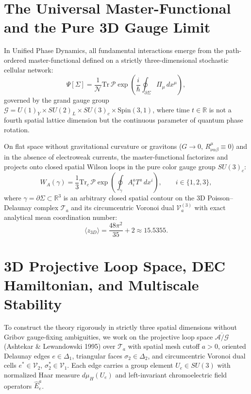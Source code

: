 \documentclass[11pt, a4paper]{article}
\theoremstyle{definition}
\theoremstyle{remark}
\begin{document}
\section{The Universal Master-Functional and the Pure 3D Gauge Limit}

In Unified Phase Dynamics, all fundamental interactions emerge from the path-ordered master-functional defined on a strictly three-dimensional stochastic cellular network:
\begin{equation}
  \Psi[\Sigma] = \frac{1}{\mathcal{N}} \mathrm{Tr}\,\mathcal{P}\exp\!\left(\frac{i}{\hbar}\oint_{\partial\Sigma} \Pi_{\mu}\,dx^{\mu}\right),
\end{equation}
governed by the grand gauge group $\mathcal{G} = U(1)_{Y} \times SU(2)_{L} \times SU(3)_{c} \times \mathrm{Spin}(3,1)$, where time $t \in \mathbb{R}$ is not a fourth spatial lattice dimension but the continuous parameter of quantum phase rotation.

On flat space without gravitational curvature or gravitons ($G \to 0$, $R^{\mu}_{\nu\alpha\beta} \equiv 0$) and in the absence of electroweak currents, the master-functional factorizes and projects onto closed spatial Wilson loops in the pure color gauge group $SU(3)_{c}$:
\begin{equation}
  W_{A}(\gamma) = \frac{1}{3}\mathrm{Tr}_{c}\,\mathcal{P}\exp\!\left(\oint_{\gamma} A_{i}^{a}T^{a}\,dx^{i}\right), \qquad i \in \{1, 2, 3\},
\end{equation}
where $\gamma = \partial\Sigma \subset \mathbb{R}^{3}$ is an arbitrary closed spatial contour on the 3D Poisson--Delaunay complex $\mathcal{T}_{a}$ and its circumcentric Voronoi dual $\mathcal{V}_{a}^{(3)}$ with exact analytical mean coordination number:
\begin{equation}
  \langle z_{3D} \rangle = \frac{48\pi^{2}}{35} + 2 \approx 15.5355.
\end{equation}

\section{3D Projective Loop Space, DEC Hamiltonian, and Multiscale Stability}

To construct the theory rigorously in strictly three spatial dimensions without Gribov gauge-fixing ambiguities, we work on the projective loop space $\overline{\mathcal{A}/\mathcal{G}}$ (Ashtekar \& Lewandowski 1995) over $\mathcal{T}_{a}$ with spatial mesh cutoff $a > 0$, oriented Delaunay edges $e \in \Delta_{1}$, triangular faces $\sigma_{2} \in \Delta_{2}$, and circumcentric Voronoi dual cells $e^{*} \in \mathcal{V}_{2}$, $\sigma_{2}^{*} \in \mathcal{V}_{1}$. Each edge carries a group element $U_{e} \in SU(3)$ with normalized Haar measure $d\mu_{H}(U_{e})$ and left-invariant chromoelectric field operators $\hat{E}_{e}^{a}$.
\end{document}
